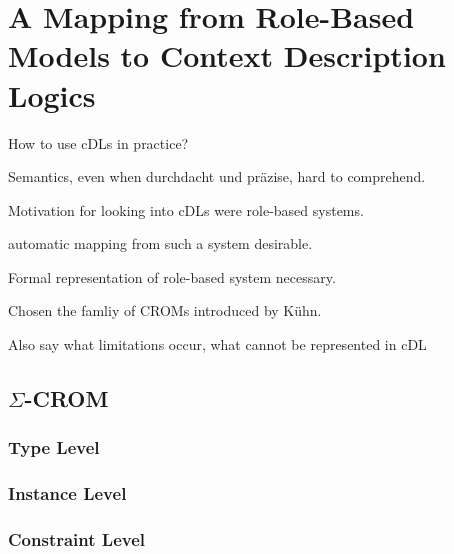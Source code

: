 
\chapter{A Mapping from Role-Based Models to Context Description Logics}
\label{cha:mapping}

How to use cDLs in practice?

Semantics, even when durchdacht und präzise, hard to comprehend.

Motivation for looking into cDLs were role-based systems.

automatic mapping from such a system desirable.

Formal representation of role-based system necessary.

Chosen the famliy of CROMs introduced by Kühn.

Also say what limitations occur, what cannot be represented in cDL

\section{\texorpdfstring{$\Sigma$}{Σ}-CROM}
\label{sec:sigma-crom}


\subsection{Type Level}
\label{sec:type-level}




\subsection{Instance Level}
\label{sec:instance-level}




\subsection{Constraint Level}
\label{sec:constraint-level}










